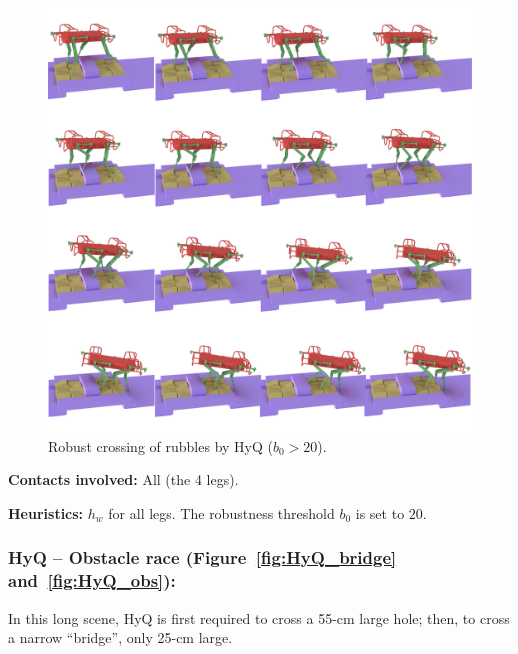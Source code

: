 \begin{figure}
  \centering
  \includegraphics[width=1\linewidth]{figures/darpa}
  \caption{
           Robust crossing of rubbles by HyQ ($b_0 > 20$). }
		   \label{fig:darpa}
\end{figure}


\noindent\textbf{Contacts involved:} All (the 4 legs).

\noindent\textbf{Heuristics:} $h_w$ for all legs. The robustness threshold $b_0$ is set to $20$.


\subsubsection{HyQ -- Obstacle race (Figure~\ref{fig:HyQ_bridge} and~\ref{fig:HyQ_obs}):}
In this long scene, HyQ is first required to cross a 55-cm large hole; then, to cross a narrow ``bridge'', only 25-cm large.


